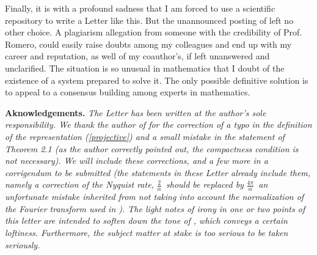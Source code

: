 \documentclass[11pt,reqno]{amsart}
\numberwithin{equation}{section}
\theoremstyle{plain}
\theoremstyle{definition}
\theoremstyle{remark}
\begin{document}
Finally, it is with a profound sadness that I am forced to use a scientific
repository to write a Letter like this. But the unannounced posting of \cite%
{Letter} left no other choice. A plagiarism allegation from someone with the
credibility of Prof. Romero, could easily raise doubts among my colleagues
and end up with my career and reputation, as well of my coauthor's, if left
unanswered and unclarified. The situation is so unusual in mathematics that
I doubt of the existence of a system prepared to solve it. The only possible
definitive solution is to appeal to a consensus building among experts in
mathematics.%
\begin{equation*}
\end{equation*}

\textbf{Aknowledgements. }\emph{The Letter has been written at the author's
sole responsibility. We thank the author of \cite{Letter} for the correction
of a typo in the definition of the representation (\ref{projective}) and a
small mistake in the statement of Theorem 2.1 (as the author correctly
pointed out, the compactness condition is not necessary). We will include
these corrections, and a few more in a corrigendum to be submitted (the
statements in these Letter already include them, namely a correction of the
Nyquist rate, }$\frac{2}{\alpha }$\emph{\ should be replaced by }$\frac{4\pi 
}{\alpha }$\emph{\ an unfortunate mistake inherited from not taking into
account the normalization of the Fourier transform used in \cite{Affine}).
The light notes of irony in one or two points of this letter are intended to
soften down the tone of \cite{Letter}, which conveys a certain loftiness.
Furthermore, the subject matter at stake is too serious to be taken
seriously.}
\end{document}
